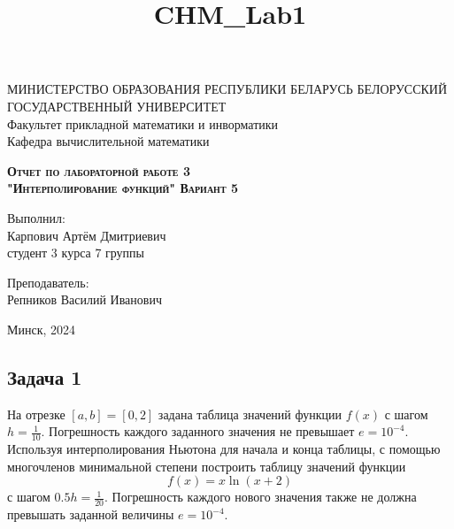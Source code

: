 \documentclass[11pt]{article}
\title{CHM\_Lab1}
\begin{document}
    
    \begin{titlepage}
    \newpage
    
    \begin{center}
    МИНИСТЕРСТВО ОБРАЗОВАНИЯ РЕСПУБЛИКИ БЕЛАРУСЬ БЕЛОРУССКИЙ ГОСУДАРСТВЕННЫЙ УНИВЕРСИТЕТ \\
    Факультет прикладной математики и инворматики \\ Кафедра вычислительной математики
 
    \end{center}
    
    \vspace{8em}
    
    \vspace{2em}
    
    \begin{center}
    \textsc{\textbf{Отчет по лабораторной работе 3 \\ "Интерполирование функций" \linebreak Вариант 5}}
    \end{center}
    
    \vspace{6em}
    
    \begin{flushright}
        Выполнил:\\
        Карпович Артём Дмитриевич\\
        студент 3 курса 7 группы
    \end{flushright}
    
    \begin{flushright}
        Преподаватель:\\
        Репников Василий Иванович
    \end{flushright}
    
    \vspace{\fill}
    
    \vspace{\fill}
    
    \begin{center}
    Минск, 2024
    \end{center}
    
    \end{titlepage}
    
    \subsection*{Задача 1}

На отрезке \([a, b]=[0, 2]\) задана таблица значений функции \(f(x)\) с
шагом \(h = \frac{1}{10}\). Погрешность каждого заданного значения не
превышает \(e = 10^{-4}\). Используя интерполирования Ньютона для начала
и конца таблицы, с помощью многочленов минимальной степени построить
таблицу значений функции \[f(x)=x\ln{(x+2)}\] с шагом
\(0.5h = \frac{1}{20}\). Погрешность каждого нового значения также не
должна превышать заданной величины \(e=10^{-4}.\)
\end{document}
